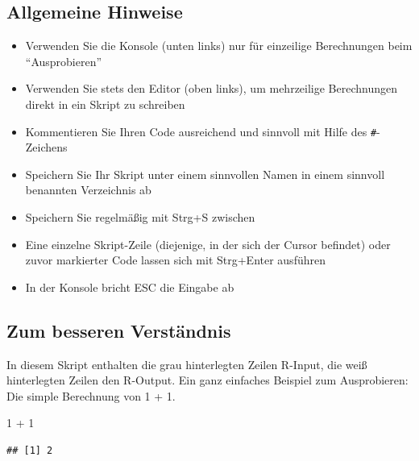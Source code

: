 \documentclass[
]{book}
\newenvironment{Shaded}{\begin{snugshade}}{\end{snugshade}}
\newcommand{\DecValTok}[1]{\textcolor[rgb]{0.00,0.00,0.81}{#1}}
\newcommand{\SpecialCharTok}[1]{\textcolor[rgb]{0.00,0.00,0.00}{#1}}
\providecommand{\tightlist}{%
  \setlength{\itemsep}{0pt}\setlength{\parskip}{0pt}}
\begin{document}
\hypertarget{allgemeine-hinweise}{%
\subsection*{Allgemeine Hinweise}\label{allgemeine-hinweise}}

\begin{itemize}
\tightlist
\item
  Verwenden Sie die Konsole (unten links) nur für einzeilige Berechnungen beim ``Ausprobieren''
\item
  Verwenden Sie stets den Editor (oben links), um mehrzeilige Berechnungen direkt in ein Skript zu schreiben
\item
  Kommentieren Sie Ihren Code ausreichend und sinnvoll mit Hilfe des \texttt{\#}-Zeichens
\item
  Speichern Sie Ihr Skript unter einem sinnvollen Namen in einem sinnvoll benannten Verzeichnis ab
\end{itemize}

\begin{itemize}
\tightlist
\item
  Speichern Sie regelmäßig mit Strg+S zwischen
\item
  Eine einzelne Skript-Zeile (diejenige, in der sich der Cursor befindet) oder zuvor markierter Code lassen sich mit Strg+Enter ausführen
\item
  In der Konsole bricht ESC die Eingabe ab
\end{itemize}

\hypertarget{zum-besseren-verstuxe4ndnis}{%
\subsection*{Zum besseren Verständnis}\label{zum-besseren-verstuxe4ndnis}}

In diesem Skript enthalten die grau hinterlegten Zeilen R-Input, die weiß hinterlegten Zeilen den R-Output. Ein ganz einfaches Beispiel zum Ausprobieren: Die simple Berechnung von 1 + 1.

\begin{Shaded}
\begin{Highlighting}[]
\DecValTok{1} \SpecialCharTok{+} \DecValTok{1}
\end{Highlighting}
\end{Shaded}

\begin{verbatim}
## [1] 2
\end{verbatim}
\end{document}
